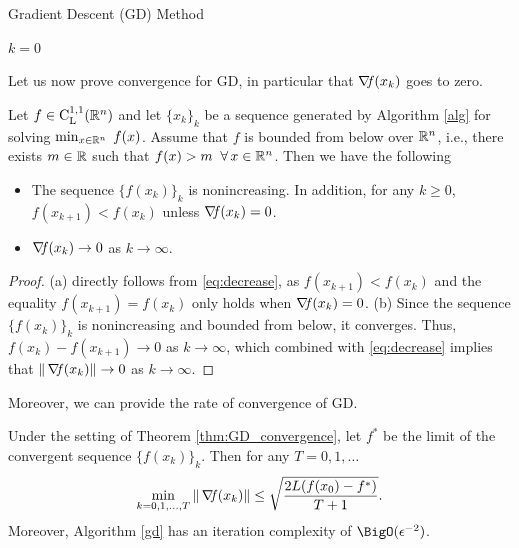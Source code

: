 \documentclass[10pt,a4paper]{article}
\begin{document}
\begin{algorithm}[H]\label{gd}
	\caption{Gradient Descent (GD) Method}
	
	
	$k = 0$
	
\end{algorithm}
\noindent Let us now prove convergence for GD, in particular that $\operatorname*{\mathit{\nabla \!f}}(x_k)$ goes to zero.
\begin{theorem}[Convergence of GD]\label{thm:GD_convergence}
	Let $f\in \mathord{\mathrm{C^{1,1}_{L}}}(\mathbb{R}^n)$ and let $\{x_k\}_k$ be a sequence generated by Algorithm \ref{alg} for solving $\min_{x\in\mathbb{R}^n}\;f(x)$. Assume that $f$ is bounded from below over $\mathbb{R}^n$, i.e., there exists $m\in \mathbb{R}$ such that $f(x)>m \;\; \forall\, x\in \mathbb{R}^n$. Then we have the following
	\begin{itemize}
		\item[(a)] The sequence $\{f(x_k)\}_k$ is nonincreasing. In addition, for any $k\geq 0$, $f(x_{k+1}) < f(x_k)$ unless $\operatorname*{\mathit{\nabla \!f}}(x_k)=0$.
		\item[(b)] $\operatorname*{\mathit{\nabla \!f}}(x_k) \to 0$ as $k\to \infty$.
	\end{itemize}
\end{theorem}
\begin{proof}
	(a) directly follows from \eqref{eq:decrease}, as $f(x_{k+1}) < f(x_k)$ and the equality $f(x_{k+1}) = f(x_k)$ only holds when $\operatorname*{\mathit{\nabla \!f}}(x_k)=0$.
	(b) Since the sequence $\{f(x_k)\}_k$ is nonincreasing and bounded from below, it converges. Thus, $f(x_k) - f(x_{k+1}) \to 0$ as $k\to \infty$, which combined with \eqref{eq:decrease} implies that $\|\operatorname*{\mathit{\nabla \!f}}(x_k)\|\to 0$ as $k\to \infty$.  
\end{proof}
\noindent Moreover, we can provide the rate of convergence of GD.
\begin{theorem}
	Under the setting of Theorem \ref{thm:GD_convergence}, let $f^*$ be the limit of the convergent sequence $\{f(x_k)\}_k$. Then for any $T=0,1, \dots$
	\begin{equation}\label{eq:convergence_rate}
		\min_{k=0,1,\dots, T} \| \operatorname*{\mathit{\nabla \!f}}(x_k) \|\leq \sqrt{\frac{2L (f(x_0) -f^*)}{T+1}}.
	\end{equation}
Moreover, Algorithm \ref{gd} has an iteration complexity of $\BigO(\epsilon^{-2})$.
\end{theorem}
\end{document}
